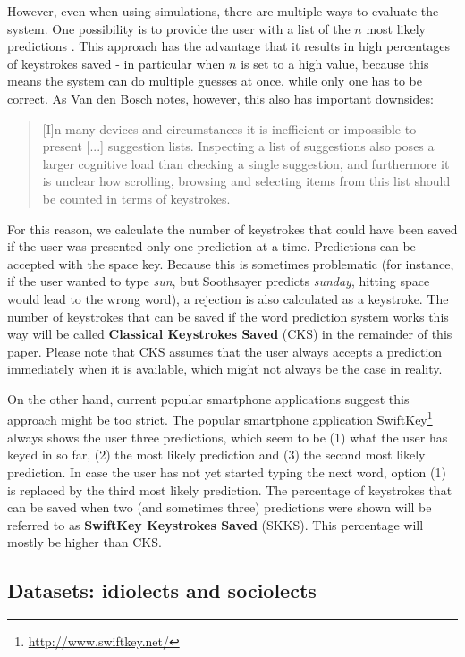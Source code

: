 \documentclass[12pt]{article}
\begin{document}
However, even when using simulations, there are multiple ways to evaluate the system. One possibility is to provide the user with a list of the $n$ most likely predictions \cite{Lesher+99,Fazly+03}. This approach has the advantage that it results in high percentages of keystrokes saved - in particular when $n$ is set to a high value, because this means the system can do multiple guesses at once, while only one has to be correct. As Van den Bosch \citeyear{vandenbosch11} notes, however, this also has important downsides: 

\begin{quotation}
[I]n many devices and circumstances it is inefficient or impossible to present [...] suggestion lists. Inspecting a list of suggestions also poses a larger cognitive load than checking a single suggestion, and furthermore it is unclear how scrolling, browsing and selecting items from this list should be counted in terms of keystrokes.
\end{quotation}

For this reason, we calculate the number of keystrokes that could have been saved if the user was presented only one prediction at a time. Predictions can be accepted with the space key. Because this is sometimes problematic (for instance, if the user wanted to type \emph{sun}, but Soothsayer predicts \emph{sunday}, hitting space would lead to the wrong word), a rejection is also calculated as a keystroke. The number of keystrokes that can be saved if the word prediction system works this way will be called \textbf{Classical Keystrokes Saved} (CKS) in the remainder of this paper. Please note that CKS assumes that the user always accepts a prediction immediately when it is available, which might not always be the case in reality.

On the other hand, current popular smartphone applications suggest this approach might be too strict. The popular smartphone application SwiftKey\footnote{\url{http://www.swiftkey.net/}} always shows the user three predictions, which seem to be (1) what the user has keyed in so far, (2) the most likely prediction and (3) the second most likely prediction. In case the user has not yet started typing the next word, option (1) is replaced by the third most likely prediction. The percentage of keystrokes that can be saved when two (and sometimes three) predictions were shown will be referred to as \textbf{SwiftKey Keystrokes Saved} (SKKS). This percentage will mostly be higher than CKS.

\subsection{Datasets: idiolects and sociolects} \label{model}
\end{document}
